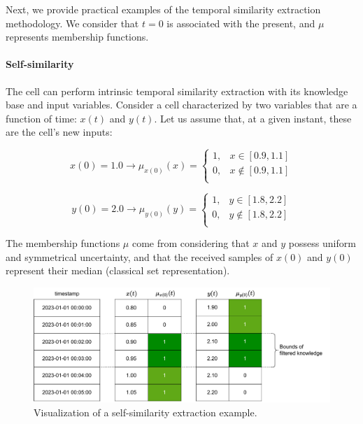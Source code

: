 Next, we provide practical examples of the temporal similarity extraction methodology. We consider that $t=0$ is associated with the present, and $\mu$ represents membership functions.

\paragraph{Self-similarity}

The cell can perform intrinsic temporal similarity extraction with its knowledge base and input variables. Consider a cell characterized by two variables that are a function of time: $x(t)$ and $y(t)$.
Let us assume that, at a given instant, these are the cell's new inputs:

\begin{equation}
    x(0) = 1.0 \rightarrow \mu_{x(0)}(x) =
    \begin{cases}
        1, & x \in [0.9, 1.1]    \\
        0, & x \notin [0.9, 1.1] \\
    \end{cases}
\end{equation}

\begin{equation}
    y(0) = 2.0 \rightarrow \mu_{y(0)}(y) =
    \begin{cases}
        1, & y \in [1.8, 2.2]    \\
        0, & y \notin [1.8, 2.2] \\
    \end{cases}
\end{equation}

The membership functions $\mu$ come from considering that $x$ and $y$ possess uniform and symmetrical uncertainty, and that the received samples of $x(0)$ and $y(0)$ represent their median (classical set representation).

\begin{figure}[h!]
    \centering
    \includegraphics[width=\linewidth]{figures/chapter4/cell/solo_state_estimation.pdf}
    \caption{Visualization of a self-similarity extraction example.}
    \label{fig:solo_state_estimation}
\end{figure}


